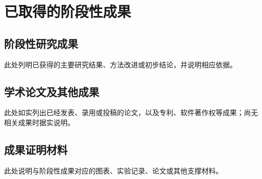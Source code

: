 \chapter{已取得的阶段性成果}

\section{阶段性研究成果}
此处列明已获得的主要研究结果、方法改进或初步结论，并说明相应依据。

\section{学术论文及其他成果}
此处如实列出已经发表、录用或投稿的论文，以及专利、软件著作权等成果；尚无相关成果时据实说明。

\section{成果证明材料}
此处说明与阶段性成果对应的图表、实验记录、论文或其他支撑材料。
